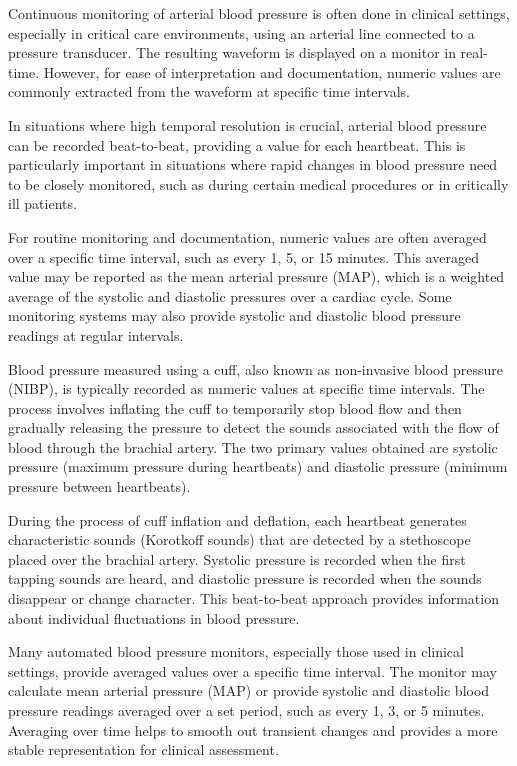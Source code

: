 \documentclass[12pt, bibliography=totoc]{scrartcl}
\begin{document}
Continuous monitoring of arterial blood pressure is often done in clinical settings, especially in critical care environments, using an arterial line connected to a pressure transducer. The resulting waveform is displayed on a monitor in real-time.
However, for ease of interpretation and documentation, numeric values are commonly extracted from the waveform at specific time intervals.

In situations where high temporal resolution is crucial, arterial blood pressure can be recorded beat-to-beat, providing a value for each heartbeat.
This is particularly important in situations where rapid changes in blood pressure need to be closely monitored, such as during certain medical procedures or in critically ill patients.

For routine monitoring and documentation, numeric values are often averaged over a specific time interval, such as every 1, 5, or 15 minutes.
This averaged value may be reported as the mean arterial pressure (MAP), which is a weighted average of the systolic and diastolic pressures over a cardiac cycle.
Some monitoring systems may also provide systolic and diastolic blood pressure readings at regular intervals.

Blood pressure measured using a cuff, also known as non-invasive blood pressure (NIBP), is typically recorded as numeric values at specific time intervals. The process involves inflating the cuff to temporarily stop blood flow and then gradually releasing the pressure to detect the sounds associated with the flow of blood through the brachial artery. The two primary values obtained are systolic pressure (maximum pressure during heartbeats) and diastolic pressure (minimum pressure between heartbeats).

During the process of cuff inflation and deflation, each heartbeat generates characteristic sounds (Korotkoff sounds) that are detected by a stethoscope placed over the brachial artery.
Systolic pressure is recorded when the first tapping sounds are heard, and diastolic pressure is recorded when the sounds disappear or change character.
This beat-to-beat approach provides information about individual fluctuations in blood pressure.

Many automated blood pressure monitors, especially those used in clinical settings, provide averaged values over a specific time interval.
The monitor may calculate mean arterial pressure (MAP) or provide systolic and diastolic blood pressure readings averaged over a set period, such as every 1, 3, or 5 minutes.
Averaging over time helps to smooth out transient changes and provides a more stable representation for clinical assessment.
\end{document}
